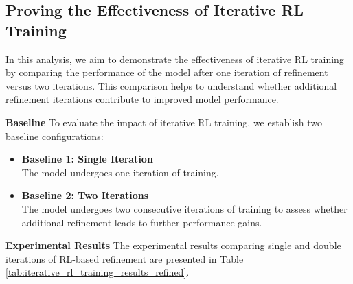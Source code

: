 \subsection{Proving the Effectiveness of Iterative RL Training}

In this analysis, we aim to demonstrate the effectiveness of iterative RL training by comparing the performance of the model after one iteration of refinement versus two iterations. This comparison helps to understand whether additional refinement iterations contribute to improved model performance.

\textbf{Baseline} To evaluate the impact of iterative RL training, we establish two baseline configurations:
\begin{itemize}[noitemsep,left=0pt]
    \item \textbf{Baseline 1: Single Iteration} \\
    The model undergoes one iteration of training.
    
    \item \textbf{Baseline 2: Two Iterations} \\
   The model undergoes two consecutive iterations of training to assess whether additional refinement leads to further performance gains.
\end{itemize}

\textbf{Experimental Results} The experimental results comparing single and double iterations of RL-based refinement are presented in Table \ref{tab:iterative_rl_training_results_refined}.


